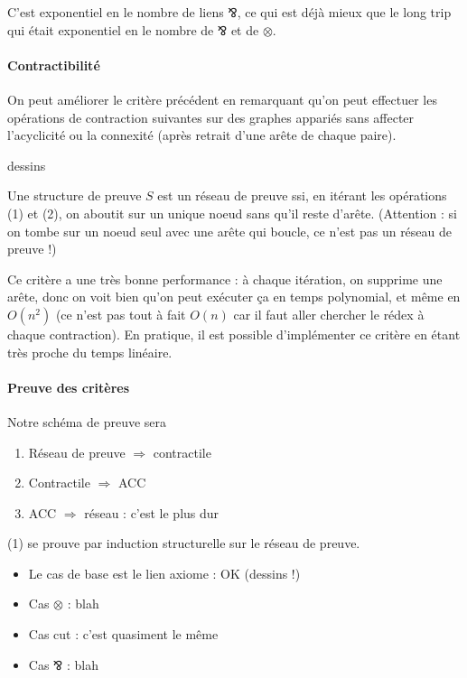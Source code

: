 \documentclass[a4paper, 11pt]{article}
\newcommand{\parr}{\mathbin{⅋}}
\begin{document}
C'est exponentiel en le nombre de liens $\parr$, ce qui est déjà mieux que le long trip qui était exponentiel en le nombre de $\parr$ et de $\otimes$.

\paragraph{Contractibilité} On peut améliorer le critère précédent en remarquant qu'on peut effectuer les opérations de contraction suivantes sur des graphes appariés sans affecter l'acyclicité ou la connexité (après retrait d'une arête de chaque paire).

dessins

Une structure de preuve $S$ est un réseau de preuve ssi, en itérant les opérations (1) et (2), on aboutit sur un unique noeud sans qu'il reste d'arête. (Attention : si on tombe sur un noeud seul avec une arête qui boucle, ce n'est pas un réseau de preuve !)

Ce critère a une très bonne performance : à chaque itération, on supprime une arête, donc on voit bien qu'on peut exécuter ça en temps polynomial, et même en $O(n^2)$ (ce n'est pas tout à fait $O(n)$ car il faut aller chercher le rédex à chaque contraction). En pratique, il est possible d'implémenter ce critère en étant très proche du temps linéaire.

\paragraph{Preuve des critères} Notre schéma de preuve sera
\begin{enumerate}
\item Réseau de preuve $\Rightarrow$ contractile
\item Contractile $\Rightarrow$ ACC
\item ACC $\Rightarrow$ réseau : c'est le plus dur
\end{enumerate}

(1) se prouve par induction structurelle sur le réseau de preuve.
\begin{itemize}
\item Le cas de base est le lien axiome : OK (dessins !)
\item Cas $\otimes$ : blah
\item Cas cut : c'est quasiment le même
\item Cas $\parr$ : blah
\end{itemize}
\end{document}
